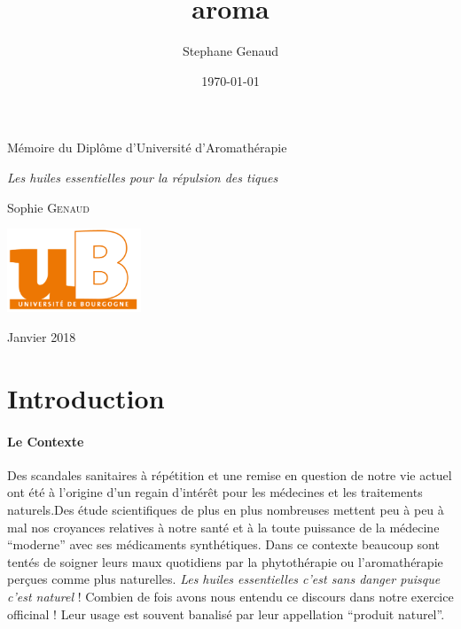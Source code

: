\documentclass[12pt,a4wide]{article}
\author{Stephane Genaud}
\date{\today}
\title{aroma}
\begin{document}
\maketitle
\begin{export}
\begin{titlepage}
\begin{center}
{\large Mémoire du Diplôme d'Université d'Aromathérapie \par}
\vspace{.7cm}
{\Large \emph{Les huiles essentielles pour la répulsion des tiques} \par}
\vspace{2cm}
{\large Sophie \textsc{Genaud} \par}
\vspace{2cm}
{\Large  \par}
\end{center}
\vfill
\begin{center}

{\includegraphics[width=4cm]{img/logo-uB-filet.png} \par}
{\large Janvier 2018}
\end{center}
\end{titlepage}

\tableofcontents
\newpage
\end{export}






\section{Introduction}
\label{sec-1}

\paragraph{Le Contexte}
\label{sec-1-0-0-1}
Des scandales  sanitaires à répétition  et une remise  en question de  notre vie
actuel  ont été  à l'origine  d'un regain  d'intérêt pour  les médecines  et les
traitements naturels.Des étude scientifiques de  plus en plus nombreuses mettent
peu à peu à mal nos croyances relatives à notre santé et à la toute puissance de
la médecine  ``moderne'' avec  ses médicaments  synthétiques.  Dans  ce contexte
beaucoup sont  tentés de soigner leurs  maux quotidiens par la  phytothérapie ou
l'aromathérapie perçues comme plus naturelles.
\emph{Les huiles essentielles c'est sans danger puisque c'est naturel} !
Combien de fois avons nous entendu ce discours dans notre exercice officinal !
Leur usage est souvent banalisé par leur appellation ``produit naturel''.\\
\end{document}
